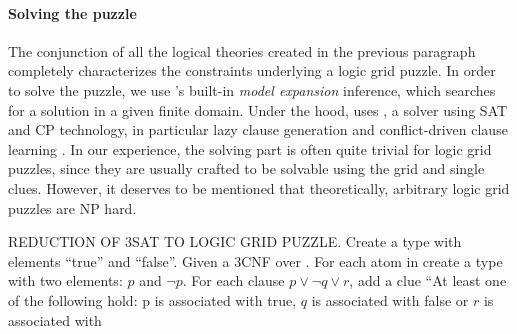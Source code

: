

\paragraph{Solving the puzzle}
The conjunction of all the logical theories created in the previous paragraph completely characterizes the constraints underlying a logic grid puzzle.
In order to solve the puzzle, we use \idp's built-in \emph{model expansion} inference, which searches for a solution in a given finite domain. Under the hood, \idp uses \minisatid {}, a solver using SAT  and CP  technology, in particular lazy clause generation  and conflict-driven clause learning . In our experience, the solving part is often quite trivial for logic grid puzzles, since they are usually crafted to be solvable using the grid and single clues. However, it deserves to be mentioned that theoretically, arbitrary logic grid puzzles are NP hard.


REDUCTION OF 3SAT TO LOGIC GRID PUZZLE. 
Create a type with elements ``true'' and ``false''. 
Given a 3CNF over \voc. For each atom in \voc create a type with two elements: $p$ and $\lnot p$.
For each clause $p \lor \lnot q \lor r$, add a clue 
``At least one of the following hold: p is associated with true, $q$ is associated with false or $r$ is associated with 




